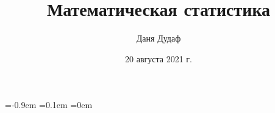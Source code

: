 \documentclass[a4paper,14pt]{article}
\title{Математическая статистика}
\author{Даня Дудаф}
\date{20 августа 2021 г.}
\theoremstyle{definition}
\begin{document}
    \abovedisplayshortskip=-0.9em
    \abovedisplayskip=0.1em
    \belowdisplayskip=0em

    \maketitle
    \thispagestyle{empty}
    \tableofcontents
    \newpage

    
    

\end{document}
